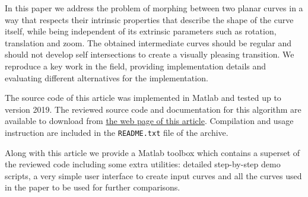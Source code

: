 \documentclass{ipol}
\begin{document}
	
	
	
	
	\begin{ipolAbstract}
	In this paper we address the problem of morphing between two planar curves in a way that respects their intrinsic properties that describe the shape of the curve itself, while being independent of its extrinsic parameters such as rotation, translation and zoom.
	The obtained intermediate curves should be regular and should not develop self intersections to create a visually pleasing transition.
	We reproduce a key work in the field, providing implementation details and 
	evaluating different alternatives for the implementation.
	\end{ipolAbstract}
 	\begin{ipolCode}
		The source code of this article was implemented in Matlab and tested up to version 2019. The reviewed source code and documentation for this algorithm
		are available to download from \href{\ipolLink}{the web page of this
			article}. Compilation and usage instruction are included in the
		\verb|README.txt| file of the archive.
	\end{ipolCode}
%
	\begin{ipolSupp}
		Along with this article we provide a Matlab toolbox which contains a superset of the reviewed code including some extra utilities: detailed step-by-step demo scripts, a very simple user interface to create input curves and all the curves used in the paper to be used for further comparisons.
	\end{ipolSupp}
\clearpage
\end{document}
